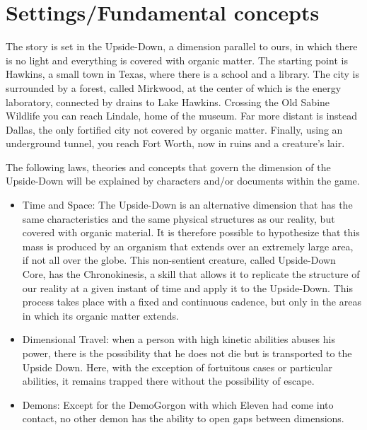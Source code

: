 \section{Settings/Fundamental concepts}
The story is set in the Upside-Down, a dimension parallel to ours, in which there is no light and everything is covered with organic matter.
The starting point is Hawkins, a small town in Texas, where there is a school and a library. The city is surrounded by a forest, called Mirkwood, at the center of which is the energy laboratory, connected by drains to Lake Hawkins. Crossing the Old Sabine Wildlife you can reach Lindale, home of the museum. Far more distant is instead Dallas, the only fortified city not covered by organic matter. Finally, using an underground tunnel, you reach Fort Worth, now in ruins and a creature's lair.

The following laws, theories and concepts that govern the dimension of the Upside-Down will be explained by characters and/or documents within the game.

\begin{itemize}
	\item Time and Space: The Upside-Down is an alternative dimension that has the same characteristics and the same physical structures as our reality, but covered with organic material. It is therefore possible to hypothesize that this mass is produced by an organism that extends over an extremely large area, if not all over the globe. This non-sentient creature, called Upside-Down Core, has the Chronokinesis, a skill that allows it to replicate the structure of our reality at a given instant of time and apply it to the Upside-Down. This process takes place with a fixed and 
	continuous cadence, but only in the areas in which its organic matter extends.
	\item Dimensional Travel: when a person with high kinetic abilities abuses his power, there is the possibility that he does not die but is transported to the Upside Down. Here, with the exception of fortuitous cases or particular abilities, it remains trapped there without the possibility of escape.
	\item Demons: Except for the DemoGorgon with which Eleven had come into contact, no other demon has the ability to open gaps between dimensions.
\end{itemize}

